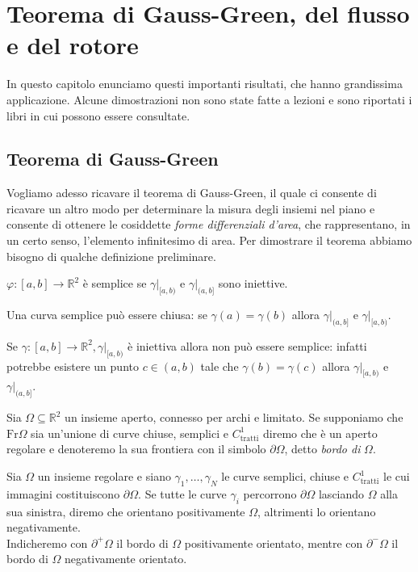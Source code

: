 \chapter{Teorema di Gauss-Green, del flusso e del rotore}
In questo capitolo enunciamo questi importanti risultati, che hanno grandissima applicazione. Alcune dimostrazioni non sono state fatte a lezioni e sono riportati i libri in cui possono essere consultate. 
%
\vspace{0.5cm}
\section{Teorema di Gauss-Green}
Vogliamo adesso ricavare il teorema di Gauss-Green, il quale ci consente di ricavare un altro modo per determinare la misura degli insiemi nel piano e consente di ottenere le cosiddette \emph{forme differenziali d'area}, che rappresentano, in un certo senso, l'elemento infinitesimo di area. Per dimostrare il teorema
abbiamo bisogno di qualche definizione preliminare.
%
\vspace{0.5cm}
\begin{theorem}[\textcolor{blue}{curva semplice}]
	$\varphi: [a, b] \to \mathbb{R}^2$ è semplice se $\gamma|_{[a, b)}$ e $\gamma|_{(a, b]}$ sono iniettive.
\end{theorem}
%
\begin{remark}
	Una curva semplice può essere chiusa: se $\gamma(a) = \gamma(b)$ allora $\gamma|_{(a, b]}$ e $\gamma|_{[a, b)}$.
\end{remark}
%
\begin{remark}
	Se $\gamma: [a, b] \to \mathbb{R}^2, \gamma|_{[a, b)}$ è iniettiva allora non può essere semplice: infatti potrebbe esistere un punto $c \in (a, b)$ tale che
	$\gamma(b) = \gamma(c)$ allora $\gamma|_{[a, b)}$ e $\gamma|_{(a, b]}$.
\end{remark}
%
\vspace{0.5cm}
\begin{definition}[\textcolor{blue}{aperto regolare}]
	Sia $\Omega \subseteq \mathbb{R}^2$ un insieme aperto, connesso per archi e limitato. Se supponiamo che $\text{Fr}\Omega$ sia un'unione di curve chiuse, semplici e $C^1_\text{tratti}$ diremo che
	è un aperto regolare e denoteremo la sua frontiera con il simbolo $\partial \Omega$, detto \emph{bordo di} $\Omega$.
\end{definition}
%
\vspace{0.5cm}
\begin{definition}[\textcolor{blue}{orientazione del bordo regolare}]
	Sia $\Omega$ un insieme regolare e siano $\gamma_1, \ldots, \gamma_N$ le curve semplici, chiuse e $C^1_\text{tratti}$ le cui immagini costituiscono $\partial \Omega$. Se tutte le curve $\gamma_i$ percorrono
	$\partial \Omega$ lasciando $\Omega$ alla sua sinistra, diremo che orientano positivamente $\Omega$, altrimenti lo orientano negativamente. \\
	Indicheremo con $\partial^{+} \Omega$ il bordo di $\Omega$ positivamente orientato, mentre con $\partial^{-} \Omega$ il bordo di $\Omega$ negativamente orientato.
\end{definition}
